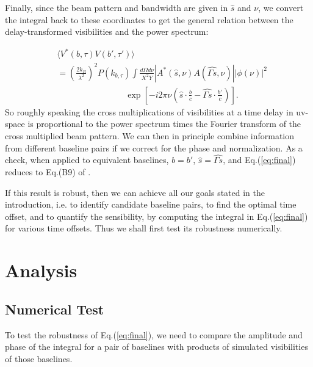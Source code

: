 \documentclass[preprint2,numberedappendix,tighten,twocolappendix]{aastex6}  %
\renewcommand\[{\begin{equation}}
\renewcommand\]{\end{equation}}
\begin{document}
Finally, since the beam pattern and bandwidth are given in $\hat{s}$
and $\nu$, we convert the integral back to these coordinates to get
the general relation between the delay-transformed visibilities and
the power spectrum:

\begin{equation}
\boxed{\begin{aligned} & \langle V^{*}(b,\tau)V(b',\tau')\rangle\\
 & =\left(\frac{2k_{B}}{\lambda^{2}}\right)^{2}P(k_{b,\tau})\int\frac{d\Omega d\nu}{X^{2}Y}|A^{*}(\hat{s},\nu)A(\hat{\Gamma s},\nu)||\phi(\nu)|^{2}\\
 & \qquad \qquad \qquad \qquad \exp\left[-i2\pi\nu\left(\hat{s}\cdot\frac{b}{c}-\hat{\Gamma s}\cdot\frac{b'}{c}\right)\right].\end{aligned}}
\label{eq:final}
\end{equation}
So roughly speaking the cross multiplications of visibilities at a time delay
in uv-space is proportional to the power spectrum times the Fourier
transform of the cross multiplied beam pattern. We can then in principle
combine information from different baseline pairs if we correct for
the phase and normalization. As a check, when applied to equivalent baselines,
$b=b'$, $\hat{s}=\hat{\Gamma s}$, and Eq.(\ref{eq:final}) reduces to Eq.(B9) of \cite{paper32}. 

If this result is robust, then we can achieve all our goals stated in the introduction, i.e. to identify 
candidate baseline pairs, to find the optimal time offset, and to quantify the sensibility, by computing the integral
in Eq.(\ref{eq:final}) for various time offsets. Thus we shall first test its robustness numerically.


\section{Analysis}
\subsection{Numerical Test \label{sec:Techniquet}}

To test the robustness of Eq.(\ref{eq:final}), we need to compare the amplitude and phase of the integral
for a pair of baselines with products of simulated visibilities of those baselines. 
\end{document}
